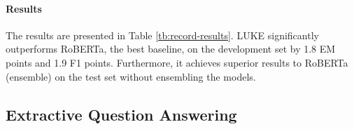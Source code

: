 \documentclass[11pt,a4paper]{article}
\begin{document}
\paragraph{Results}

\begin{table}[t]
    \centering
    \setlength{\tabcolsep}{3pt}
    \caption{Results of cloze-style question answering on the ReCoRD dataset. All models except RoBERTa (ensemble) are based on a single model.}
    \label{tb:record-results}
\end{table}

The results are presented in Table \ref{tb:record-results}.
LUKE significantly outperforms RoBERTa, the best baseline, on the development set by 1.8 EM points and 1.9 F1 points.
Furthermore, it achieves superior results to RoBERTa (ensemble) on the test set without ensembling the models.

\subsection{Extractive Question Answering}
\label{subsec:squad}
\end{document}

